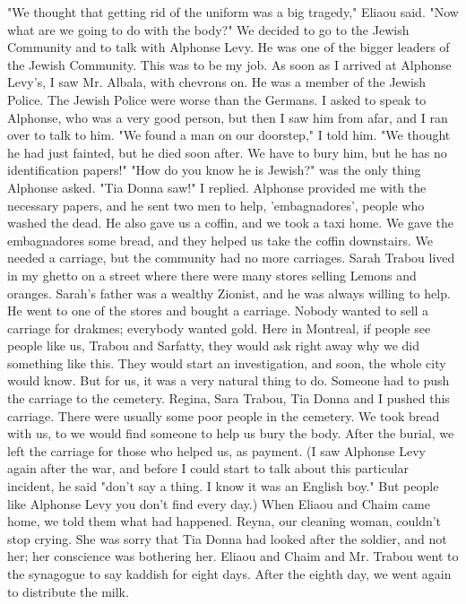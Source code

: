 "We thought that getting rid of the uniform was a big tragedy," 
Eliaou said.
"Now what are we going to do with the body?"
We decided 
to go to the Jewish Community and to talk with Alphonse Levy.
He was 
one of the bigger leaders of the Jewish Community.
This was to be my job.
As soon as I arrived at Alphonse Levy's, I saw Mr.
Albala, with 
chevrons on.
He was a member of the Jewish Police.
The Jewish Police 
were worse than the Germans.
I asked to speak to Alphonse, who was a 
very good person, but then I saw him from afar, and I ran over to talk 
to him.
"We found a man on our doorstep," I told him.
"We thought he had 
just fainted, but he died soon after.
We have to bury him, but he has 
no identification papers!"
"How do you know he is Jewish?"
was the only thing Alphonse asked.
"Tia Donna saw!"
I replied.
Alphonse provided me with the necessary papers, and he sent two 
men to help, 'embagnadores', people who washed the dead.
He also gave 
us a coffin, and we took a taxi home.
We gave the embagnadores some 
bread, and they helped us take the coffin downstairs.
We needed a carriage, but the community had no more carriages.
Sarah Trabou lived in 
my ghetto on a street where there were many stores selling Lemons and 
oranges.
Sarah's father was a wealthy Zionist, and he was always 
willing to help.
He went to one of the stores and bought a carriage.
Nobody wanted to sell a carriage for drakmes; everybody wanted gold.
Here in Montreal, if people see people like us, Trabou and Sarfatty, 
they would ask right away why we did something like this.
They would 
start an investigation, and soon, the whole city would know.
But for 
us, it was a very natural thing to do.
Someone had to push the carriage to the cemetery.
Regina, Sara 
Trabou, Tia Donna and I pushed this carriage.
There were usually some 
poor people in the cemetery.
We took bread with us, to 
we would find someone to help us bury the body.
After the burial, 
we left the carriage for those who helped us, as payment.
(I saw Alphonse Levy again after the war, and before I could 
start to talk about this particular incident, he said "don't say 
a thing.
I know it was an English boy."
But people like Alphonse Levy 
you don't find every day.)
When Eliaou and Chaim came home, we told them what had happened.
Reyna, our cleaning woman, couldn't stop crying.
She was sorry that 
Tia Donna had looked after the soldier, and not her; her conscience was 
bothering her.
Eliaou and Chaim and Mr.
Trabou went to the synagogue 
to say kaddish for eight days.
After the eighth day, we went again to 
distribute the milk.
